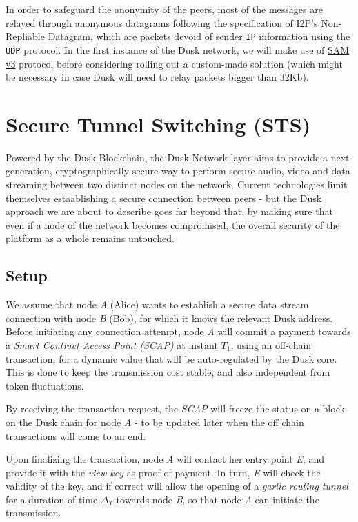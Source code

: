 In order to safeguard the anonymity of the peers, most of the messages
are relayed through anonymous datagrams following the specification of
I2P's \href{https://geti2p.net/spec/datagrams}{Non-Repliable Datagram},
which are packets devoid of sender \texttt{IP} information using the
\texttt{UDP} protocol. In the first instance of the \textrm{Dusk} network, we
will make use of \href{https://geti2p.net/el/docs/api/samv3}{SAM v3}
protocol before considering rolling out a custom-made solution (which
might be necessary in case \textrm{Dusk} will need to relay packets bigger
than 32Kb).




\section{Secure Tunnel Switching (STS)}

Powered by the \textrm{Dusk} Blockchain, the \textrm{Dusk} Network layer aims to
provide a next-generation, cryptographically secure way to perform
secure audio, video and data streaming between two distinct nodes on the
network. Current technologies limit themselves estaablishing a secure
connection between peers - but the \textrm{Dusk} approach we are about to
describe goes far beyond that, by making sure that even if a node of the
network becomes compromised, the overall security of the platform as a
whole remains untouched.

\subsection{Setup}

We assume that node \emph{A} (Alice) wants to establish a secure data
stream connection with node \emph{B} (Bob), for which it knows the
relevant \textrm{Dusk} address. Before initiating any connection attempt, node
\emph{A} will commit a payment towards a \emph{Smart Contract Access
Point (SCAP)} at instant \(T_1\), using an off-chain transaction, for a
dynamic value that will be auto-regulated by the \textrm{Dusk} core. This is
done to keep the transmission cost stable, and also independent from
token fluctuations.

By receiving the transaction request, the \emph{SCAP} will freeze the
status on a block on the \textrm{Dusk} chain for node \emph{A} - to be updated
later when the off chain transactions will come to an end.

Upon finalizing the transaction, node \emph{A} will contact her entry
point \emph{E}, and provide it with the \emph{view key} as proof of
payment. In turn, \emph{E} will check the validity of the key, and if
correct will allow the opening of a \emph{garlic routing tunnel} for a
duration of time \(\Delta_T\) towards node \emph{B}, so that node
\emph{A} can initiate the transmission.

